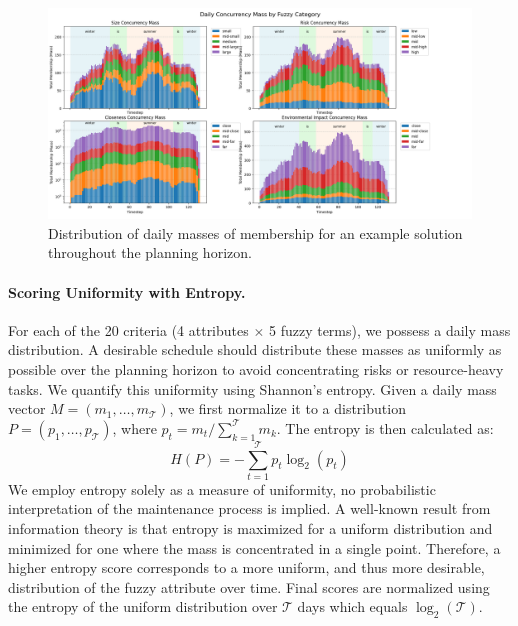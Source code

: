 \begin{figure}[!ht]
    \begin{adjustwidth}{-1.6cm}{-1.6cm}
    \includegraphics[width=1.07\linewidth]{ch3/figures/Fuzzy_att_concurrency.png}
    \end{adjustwidth}
    \caption{Distribution of daily masses of membership for an example solution throughout the planning horizon.}
    \label{fig:fuzzy_att_concurrency}
\end{figure}

\paragraph{Scoring Uniformity with Entropy.}
For each of the 20 criteria (4 attributes $\times$ 5 fuzzy terms), we possess a daily mass distribution. A desirable schedule should distribute these masses as uniformly as possible over the planning horizon to avoid concentrating risks or resource-heavy tasks. We quantify this uniformity using Shannon's entropy. Given a daily mass vector $M = (m_1, \dots, m_\mathcal{T})$, we first normalize it to a distribution $P = (p_1, \dots, p_\mathcal{T})$, where $p_t = m_t / \sum_{k=1}^\mathcal{T} m_k$. The entropy is then calculated as:
\[
H(P) = - \sum_{t=1}^{\mathcal{T}} p_t \log_2(p_t)
\]
We employ entropy solely as a measure of uniformity, no probabilistic interpretation of the maintenance process is implied. A well-known result from  information theory \cite{Entropy} is that entropy is maximized for a uniform distribution and minimized for one where the mass is concentrated in a single point. Therefore, a higher entropy score corresponds to a more uniform, and thus more desirable, distribution of the fuzzy attribute over time. Final scores are normalized using the entropy of the uniform distribution over $\mathcal{T}$ days which equals $\log_2(\mathcal{T})$.